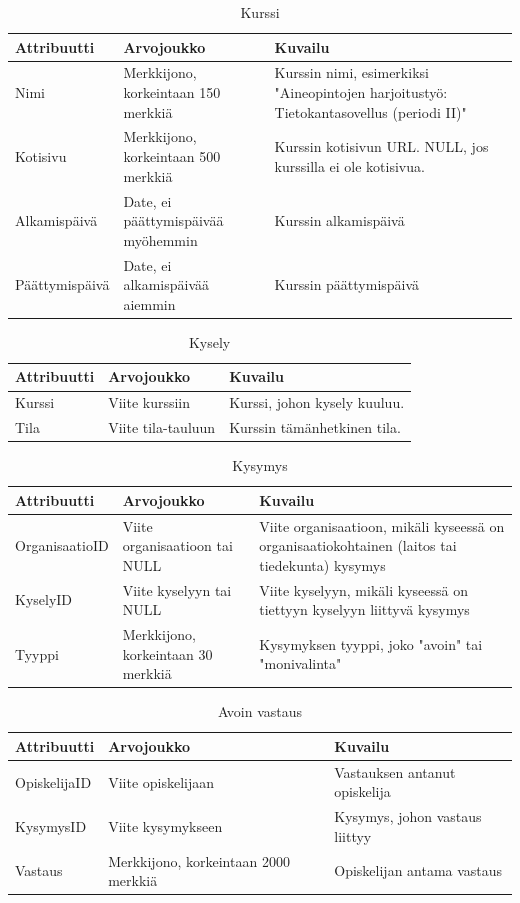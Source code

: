 \documentclass[12pt,a4paper,titlepage]{article}
\begin{document}
\begin{table}[h]
\caption{Kurssi}
\begin{tabularx}{\textwidth}{ |  l X X  |}
  \hline
  Attribuutti & Arvojoukko & Kuvailu \\
  \hline
  Nimi & Merkkijono, korkeintaan 150 merkkiä & Kurssin nimi, esimerkiksi "Aineopintojen harjoitustyö: Tietokantasovellus (periodi II)" \\
  Kotisivu & Merkkijono, korkeintaan 500 merkkiä & Kurssin kotisivun URL. NULL, jos kurssilla ei ole kotisivua. \\
  Alkamispäivä & Date, ei päättymispäivää myöhemmin & Kurssin alkamispäivä \\
  Päättymispäivä & Date, ei alkamispäivää aiemmin & Kurssin päättymispäivä \\
  \hline
\end{tabularx}
\end{table}


\begin{table}[h]
\caption{Kysely}
\begin{tabularx}{\textwidth}{ |  l X X  |}
  \hline
  Attribuutti & Arvojoukko & Kuvailu \\
  \hline
  Kurssi & Viite kurssiin & Kurssi, johon kysely kuuluu. \\
  Tila & Viite tila-tauluun & Kurssin tämänhetkinen tila. \\
  \hline
\end{tabularx}
\end{table}

\begin{table}[h]
\caption{Kysymys}
\begin{tabularx}{\textwidth}{ |  l X X  |}
  \hline
  Attribuutti & Arvojoukko & Kuvailu \\
  \hline
  OrganisaatioID & Viite organisaatioon tai NULL & Viite organisaatioon, mikäli kyseessä on organisaatiokohtainen (laitos tai tiedekunta) kysymys \\
  KyselyID & Viite kyselyyn tai NULL & Viite kyselyyn, mikäli kyseessä on tiettyyn kyselyyn liittyvä kysymys \\
  Tyyppi & Merkkijono, korkeintaan 30 merkkiä & Kysymyksen tyyppi, joko "avoin" tai "monivalinta"\\
  \hline
\end{tabularx}
\end{table}

\begin{table}[h]
\caption{Avoin vastaus}
\begin{tabularx}{\textwidth}{ |  l X X  |}
  \hline
  Attribuutti & Arvojoukko & Kuvailu \\
  \hline
  OpiskelijaID & Viite opiskelijaan & Vastauksen antanut opiskelija \\
  KysymysID & Viite kysymykseen & Kysymys, johon vastaus liittyy \\
  Vastaus & Merkkijono, korkeintaan 2000 merkkiä & Opiskelijan antama vastaus \\
  \hline
\end{tabularx}
\end{table}
\end{document}
